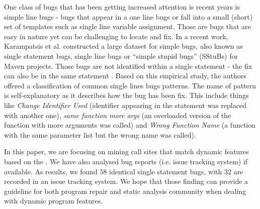 \documentclass[sigconf,review,anonymous]{acmart}
\begin{document}
One class of bugs that has been getting increased attention is recent years is simple line bugs - bugs that appear in a one line bugs or fall into a small (short) set of templates such as single line variable assignment. Those are bugs that are easy in nature yet can be challenging to locate and fix. In a recent work, Karampatsis et al. \cite{karampatsis2020often} constructed a large dataset for simple bugs, also known as single statement bugs, single line bugs or ``simple stupid bugs'' (SStuBs) for Maven projects. Those bugs are not identified within a single statement - the fix can also be in the same statement . Based on this empirical study, the authors offered a classification of common single lines bugs patterns. The name of pattern is self-explanatory as it describes how the bug has been fix. This include things like \emph{Change Identifier Used} (identifier appearing in the statement was replaced with another one), \textit{same function more args} (an overloaded version of the function with more arguments was called) and \emph{Wrong Function Name} (a function with the same parameter list but the wrong name was called). %






In this paper, we are focusing on mining call sites that match dynamic features based on the \cite{sui2018soundness}. We have also analysed bug reports (i.e. issue tracking system) if available.  As results, we found 58 identical single statement bugs, with 32 are recorded in an issue tracking system. We hope that those finding can provide a guideline for both program repair and static analysis community when dealing with dynamic program features. 
\end{document}
